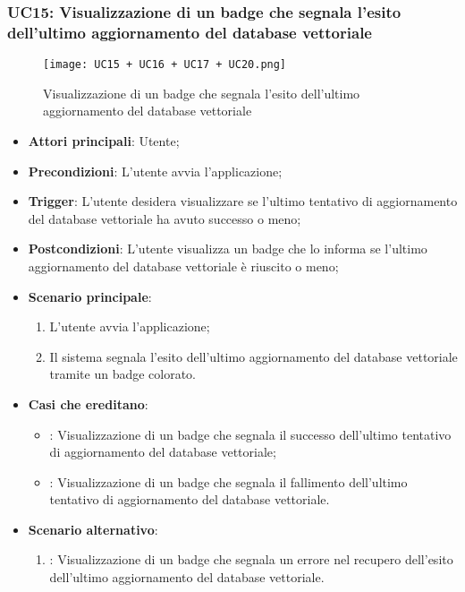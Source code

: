 \newpage

\hypertarget{UC15}{}
\subsubsection{UC15: Visualizzazione di un badge che segnala l'esito dell'ultimo aggiornamento del database vettoriale}

\begin{figure}[h]
    \centering
    \texttt{[image: UC15 + UC16 + UC17 + UC20.png]}
    \caption{Visualizzazione di un badge che segnala l'esito dell'ultimo aggiornamento del database vettoriale}
\end{figure}

\begin{itemize}
    \item \textbf{Attori principali}: Utente;
    \item \textbf{Precondizioni}: L'utente avvia l'applicazione;
    \item \textbf{Trigger}: L'utente desidera visualizzare se l'ultimo tentativo di aggiornamento del database vettoriale
    ha avuto successo o meno;
    \item \textbf{Postcondizioni}: L'utente visualizza un badge che lo informa se l'ultimo aggiornamento del database vettoriale
    è riuscito o meno;
    \item \textbf{Scenario principale}:
    \begin{enumerate}
        \item L'utente avvia l'applicazione;
        \item Il sistema segnala l'esito dell'ultimo aggiornamento del database vettoriale tramite un badge colorato.
    \end{enumerate}
    \item \textbf{Casi che ereditano}:
    \begin{itemize}
        \item {}: Visualizzazione di un badge che segnala il successo dell'ultimo tentativo di aggiornamento del database vettoriale;
        \item {}: Visualizzazione di un badge che segnala il fallimento dell'ultimo tentativo di aggiornamento del database vettoriale.
    \end{itemize}
    \item \textbf{Scenario alternativo}:
    \begin{enumerate}
        \item {}: Visualizzazione di un badge che segnala un errore nel recupero dell'esito dell'ultimo aggiornamento del database vettoriale.
    \end{enumerate}
\end{itemize}

